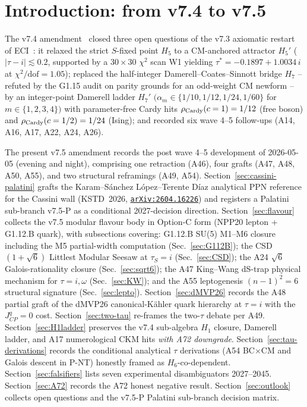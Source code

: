 \documentclass[a4paper,11pt]{article}
\newcommand{\arXiv}[1]{\href{https://arxiv.org/abs/#1}{\texttt{arXiv:#1}}}
\theoremstyle{definition}
\theoremstyle{remark}
\begin{document}
\section{Introduction: from v7.4 to v7.5}
\label{sec:intro}

The v7.4 amendment~\cite{V74amend} closed three open questions of
the v7.3 axiomatic restart of ECI~\cite{ECIv6053}: it relaxed the
strict $S$-fixed point $H_5$ to a CM-anchored attractor $H_5'$
($|\tau-i|\lesssim 0.2$, supported by a $30\times 30$ $\chi^2$ scan
W1 yielding $\tau^{*}=-0.1897+1.0034\,i$ at
$\chi^2/\mathrm{dof}=1.05$); replaced the half-integer
Damerell--Coates--Sinnott bridge $H_7$ -- refuted by the G1.15 audit
on parity grounds for an odd-weight CM newform -- by an
integer-point Damerell ladder $H_7'$
$(\alpha_m\in\{1/10,1/12,1/24,1/60\}$ for $m\in\{1,2,3,4\})$ with
parameter-free Cardy hits $\rho_{\rm Cardy}(c=1)=1/12$ (free boson)
and $\rho_{\rm Cardy}(c=1/2)=1/24$ (Ising); and recorded six wave
4--5 follow-ups (A14, A16, A17, A22, A24, A26).

The present v7.5 amendment records the post wave 4--5 development
of 2026-05-05 (evening and night), comprising one retraction
(A46), four grafts (A47, A48, A50, A55), and two structural
reframings (A49, A54).  Section~\ref{sec:cassini-palatini} grafts
the Karam--S\'anchez L\'opez--Terente D\'iaz analytical PPN
reference for the Cassini wall (KSTD~2026, \arXiv{2604.16226})
and registers a Palatini sub-branch v7.5-P as a conditional
2027-decision direction.  Section~\ref{sec:flavour} collects the
v7.5 modular flavour body in Option-C form (NPP20 lepton + G1.12.B
quark), with subsections covering: G1.12.B SU(5) M1--M6 closure
including the M5 partial-width computation
(Sec.~\ref{sec:G112B}); the CSD$(1+\sqrt 6)$ Littlest Modular
Seesaw at $\tau_S=i$ (Sec.~\ref{sec:CSD}); the A24 $\sqrt 6$
Galois-rationality closure (Sec.~\ref{sec:sqrt6}); the A47
King--Wang dS-trap physical mechanism for $\tau=i,\omega$
(Sec.~\ref{sec:KW}); and the A55 leptogenesis $(n-1)^2=6$
structural signature (Sec.~\ref{sec:lepto}).
Section~\ref{sec:dMVP26} records the A48 partial graft of the
dMVP26 canonical-K\"ahler quark hierarchy at $\tau=i$ with the
$J_{CP}^{q}=0$ cost.  Section~\ref{sec:two-tau} re-frames the
two-$\tau$ debate per A49.  Section~\ref{sec:H1ladder} preserves
the v7.4 sub-algebra $H_1$ closure, Damerell ladder, and A17
numerological CKM hits \emph{with A72 downgrade}.
Section~\ref{sec:tau-derivations}
records the conditional analytical $\tau$ derivations (A54
BC$\times$CM and Galois descent in P-NT) honestly framed as
$H_6$-co-dependent.  Section~\ref{sec:falsifiers} lists seven
experimental disambiguators 2027--2045.  Section~\ref{sec:A72}
records the A72 honest negative result.  Section~\ref{sec:outlook}
collects open questions and the v7.5-P Palatini sub-branch
decision matrix.
\end{document}
